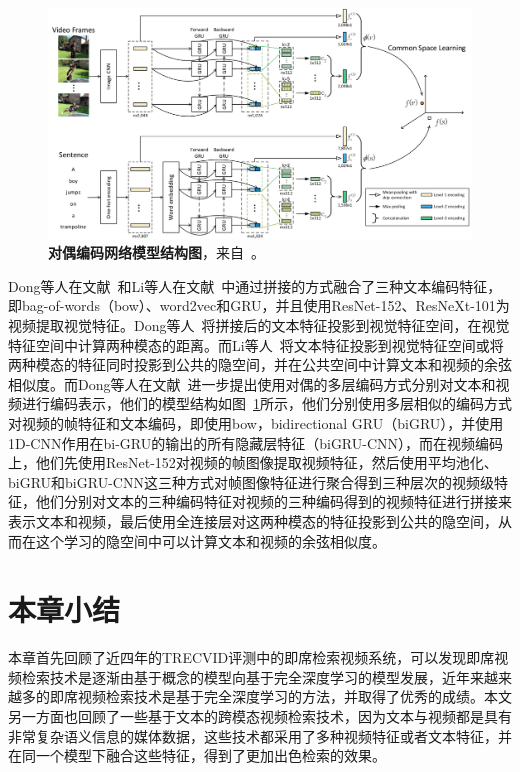 \begin{figure}[tbh!]
    \centering
    \includegraphics[width=\linewidth]{figures/related_dong2019}
    \caption[Dong等人~\cite{dong2019dual}的对偶编码网络模型结构图]{\textbf{对偶编码网络模型结构图}，来自~\cite{dong2019dual}。}
    \label{fig:related_dong2019}
\end{figure}

Dong等人在文献~\cite{dong2018predicting}和Li等人在文献~\cite{li2019w2vv++}中通过拼接的方式融合了三种文本编码特征，即bag-of-words（bow）、word2vec和GRU，并且使用ResNet-152、ResNeXt-101为视频提取视觉特征。Dong等人~\cite{dong2018predicting}将拼接后的文本特征投影到视觉特征空间，在视觉特征空间中计算两种模态的距离。而Li等人~\cite{li2019w2vv++}将文本特征投影到视觉特征空间或将两种模态的特征同时投影到公共的隐空间，并在公共空间中计算文本和视频的余弦相似度。而Dong等人在文献~\cite{dong2019dual}进一步提出使用对偶的多层编码方式分别对文本和视频进行编码表示，他们的模型结构如图~\ref{fig:related_dong2019}所示，他们分别使用多层相似的编码方式对视频的帧特征和文本编码，即使用bow，bidirectional GRU（biGRU），并使用1D-CNN作用在bi-GRU的输出的所有隐藏层特征（biGRU-CNN），而在视频编码上，他们先使用ResNet-152对视频的帧图像提取视频特征，然后使用平均池化、biGRU和biGRU-CNN这三种方式对帧图像特征进行聚合得到三种层次的视频级特征，他们分别对文本的三种编码特征对视频的三种编码得到的视频特征进行拼接来表示文本和视频，最后使用全连接层对这两种模态的特征投影到公共的隐空间，从而在这个学习的隐空间中可以计算文本和视频的余弦相似度。

\section{本章小结}
本章首先回顾了近四年的TRECVID评测中的即席检索视频系统，可以发现即席视频检索技术是逐渐由基于概念的模型向基于完全深度学习的模型发展，近年来越来越多的即席视频检索技术是基于完全深度学习的方法，并取得了优秀的成绩。本文另一方面也回顾了一些基于文本的跨模态视频检索技术，因为文本与视频都是具有非常复杂语义信息的媒体数据，这些技术都采用了多种视频特征或者文本特征，并在同一个模型下融合这些特征，得到了更加出色检索的效果。
